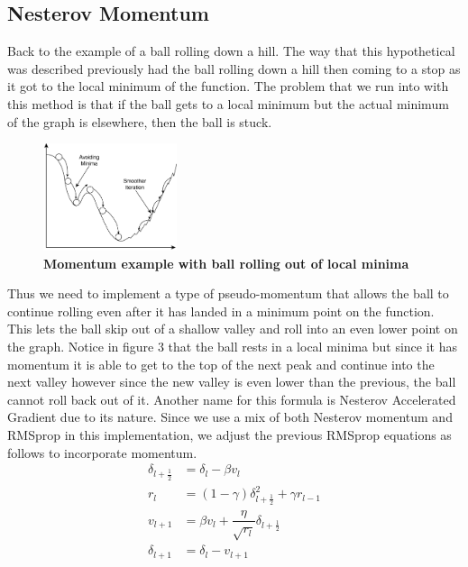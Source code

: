 \documentclass[12pt]{article}
\theoremstyle{definition}
\theoremstyle{plain}
\begin{document}
\subsection{Nesterov Momentum}
Back to the example of a ball rolling down a hill. The way that this hypothetical was described previously had the ball rolling down a hill then coming to a stop as it got to the local minimum of the function. The problem that we run into with this method is that if the ball gets to a local minimum but the actual minimum of the graph is elsewhere, then the ball is stuck. 
\begin{figure}
	\centering
	\includegraphics[width=0.35\textwidth]{Images/Momentum.png}
	\caption{\textbf{Momentum example with ball rolling out of local minima}\cite{yaldex}}
	\label{fig:Momentum}
\end{figure}
\noindent
Thus we need to implement a type of pseudo-momentum that allows the ball to continue rolling even after it has landed in a minimum point on the function. This lets the ball skip out of a shallow valley and roll into an even lower point on the graph. Notice in figure 3 that the ball rests in a local minima but since it has momentum it is able to get to the top of the next peak and continue into the next valley however since the new valley is even lower than the previous, the ball cannot roll back out of it. Another name for this formula is Nesterov Accelerated Gradient due to its nature. Since we use a mix of both Nesterov momentum and RMSprop in this implementation, we adjust the previous RMSprop equations as follows to incorporate momentum\cite{readthedocs}.
\begin{align}\label{eqn:Combined}
\delta_{l+\frac{1}{2}} &= \delta_l - \beta v_l\\
r_l &= (1-\gamma)\delta_{l+\frac{1}{2}}^2 + \gamma r_{l-1}\\
v_{l+1} &= \beta v_l + \dfrac{\eta}{\sqrt{r_l}}\delta_{l+\frac{1}{2}}\\
\delta_{l+1} &= \delta_l - v_{l+1}
\end{align}
\end{document}
